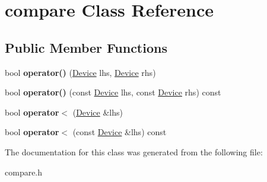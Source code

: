 \hypertarget{classcompare}{}\section{compare Class Reference}
\label{classcompare}
\subsection*{Public Member Functions}
\begin{DoxyCompactItemize}
\item 
\mbox{\label{classcompare_ab6a31eca674772d2ce4a08d67c7c66eb}} 
bool {\bfseries operator()} (\hyperlink{classDevice}{Device} lhs, \hyperlink{classDevice}{Device} rhs)
\item 
\mbox{\label{classcompare_a770655d961911a14eb479c74a7a94992}} 
bool {\bfseries operator()} (const \hyperlink{classDevice}{Device} lhs, const \hyperlink{classDevice}{Device} rhs) const
\item 
\mbox{\label{classcompare_a7389f58eb67313e0984d63218941833d}} 
bool {\bfseries operator$<$} (\hyperlink{classDevice}{Device} \&lhs)
\item 
\mbox{\label{classcompare_a177684fa3fd487882edc1878965f23bc}} 
bool {\bfseries operator$<$} (const \hyperlink{classDevice}{Device} \&lhs) const
\end{DoxyCompactItemize}


The documentation for this class was generated from the following file\+:\begin{DoxyCompactItemize}
\item 
compare.\+h\end{DoxyCompactItemize}

